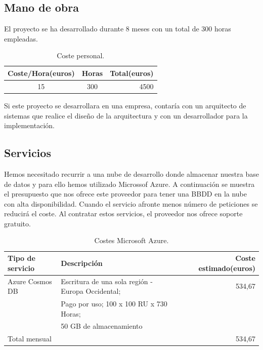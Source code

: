 \documentclass[12pt]{report} %
\begin{document}
\subsection{Mano de obra}

El proyecto se ha desarrollado durante 8 meses con un total de 300 horas empleadas.

\begin{table}[H]
	\begin{center}
		\begin{tabular}{|c|c|r|}
			\hline
			Coste/Hora(euros) & Horas & Total(euros) \\
			\hline \hline
			15 & 300 & 4500 \\ \hline
		
		\end{tabular}
		\caption{Coste personal.}		
		\label{costePersonal}
	\end{center}
\end{table}

Si este proyecto se desarrollara en una empresa, contaría con un arquitecto de sistemas que realice el diseño de la arquitectura y con un desarrollador para la implementación.

\subsection{Servicios}
Hemos necesitado recurrir a una nube de desarrollo donde almacenar nuestra base de datos y para ello hemos utilizado Microssof Azure. A continuación se muestra el presupuesto que nos ofrece este proveedor para tener una BBDD en la nube con alta disponibilidad. Cuando el servicio afronte menos número de peticiones se reducirá el coste. Al contratar estos servicios, el proveedor nos ofrece soporte gratuito.

\begin{table}[H]
	\begin{center}
		\begin{tabular}{|l|l|r|}
			\hline
			Tipo de servicio & Descripción & Coste estimado(euros) \\
			\hline \hline
			Azure Cosmos DB & Escritura de una sola región - Europa Occidental; & 534,67 \\ 
			 &  Pago por uso; 100 x 100 RU x 730 Horas; & \\
			 & 50 GB de almacenamiento & \\ \hline
			Total mensual &  & 534,67 \\ \hline
			
		\end{tabular}
		\caption{Costes Microsoft Azure.}
		\label{costeAzure}
	\end{center}
\end{table}
\end{document}
